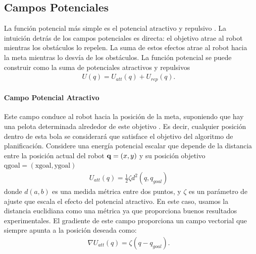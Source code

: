 \subsection{Campos Potenciales}
La funci\'on potencial m\'as simple es el potencial atractivo y 
repulsivo \cite{koren1991potential}. La intuici\'on detr\'as de los campos potenciales 
es directa: el objetivo atrae al robot mientras los obst\'aculos lo repelen. La suma de 
estos efectos atrae al robot hacia la meta mientras lo desvía de los obst\'aculos. La 
funci\'on potencial se puede construir como la suma de potenciales atractivos y repulsivos
\begin{align}
\label{eqn:potetialField}
U(q) = U_{att}(q) + U_{rep}(q).
\end{align}
\paragraph{Campo Potencial Atractivo}
Este campo conduce al robot hacia la posici\'on de la meta, suponiendo que 
hay una pelota determinada alrededor de este objetivo \cite{koren1991potential}. Es 
decir, cualquier posici\'on dentro de esta bola se considerar\'a que satisface el objetivo 
del algoritmo de planificaci\'on. Considere una energ\'ia potencial escalar 
que depende de la distancia entre la posici\'on actual del robot $\mathbf q=(x,y)$ y 
su posici\'on objetivo $\text{qgoal}=(\text{xgoal},\text{ygoal})$
\begin{align}
\label{eqn:pot_attr}
U_{att}(q) = \frac{1}{2}\zeta d^{2} (q,q_{goal})
\end{align}
donde $d(a,b)$ es una medida m\'etrica entre dos puntos, y $\zeta$ es un 
par\'ametro de ajuste que escala el efecto del potencial atractivo. En este 
caso, usamos la distancia euclidiana como una m\'etrica ya que proporciona 
buenos resultados experimentales. El gradiente de este campo proporciona un 
campo vectorial que siempre apunta a la posici\'on deseada como:
\begin{align}
\label{eqn:gradient_att}
\nabla U_{att}(q)=\zeta(q-q_{goal}).
\end{align}


